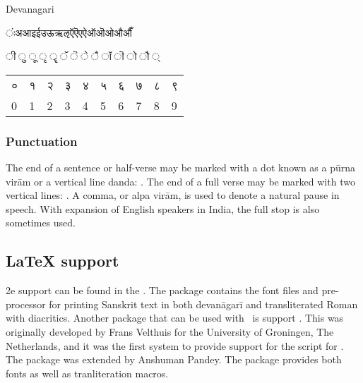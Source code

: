 \newfontfamily{}

\begin{scriptexample}[]{Devanagari}
\begin{center}\parindent0pt\devanagarilohit

ंःअआइईउऊऋऌऍऎएऐऑऒओऔऔँ \par 

ी	ु	ू	ृ	ॄ	ॅ	ॆ	े	ै	ॉ	ॊ	ो	ौ	्	\par

\bigskip		
\begin{tabular}{lll lll lll l}
०	&१	&२	&३	&४	&५	&६	&७	&८	&९\\
0	&1	&2	&3	&4	&5	&6	&7	&8	&9\\
\end{tabular}
\end{center}
\end{scriptexample}

\subsubsection{Punctuation} 
The end of a sentence or half-verse may be marked with a dot known as a pūrna virām or a vertical line danda: \textbar. The end of a full verse may be marked with two vertical lines: \textbar\textbar. A comma, or alpa virām, is used to denote a natural pause in speech. With expansion of English speakers in India, the full stop is also sometimes used.

\subsection{LaTeX support}

\latex2e support can be found in the . The package contains the font files and pre-processor for printing Sanskrit
text in both devanāgarī and transliterated Roman with diacritics. Another package that can be used with \XeTeX\ is support .  This was originally developed by Frans Velthuis for the University of Groningen, The Netherlands, and it was the first system to provide
support for the script for \tex. The package was  extended by Anshuman Pandey. The package provides both fonts as well as tranliteration macros.


